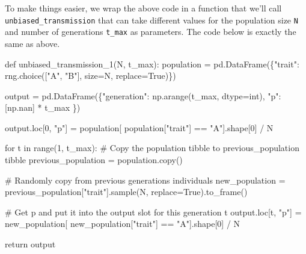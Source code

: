 \documentclass[
  a4paperpaper,
  ,captions=tableheading
]{scrbook}
\newenvironment{Shaded}{\begin{snugshade}}{\end{snugshade}}
\newcommand{\BuiltInTok}[1]{\textcolor[rgb]{0.00,0.23,0.31}{#1}}
\newcommand{\CommentTok}[1]{\textcolor[rgb]{0.37,0.37,0.37}{#1}}
\newcommand{\ControlFlowTok}[1]{\textcolor[rgb]{0.00,0.23,0.31}{#1}}
\newcommand{\DecValTok}[1]{\textcolor[rgb]{0.68,0.00,0.00}{#1}}
\newcommand{\KeywordTok}[1]{\textcolor[rgb]{0.00,0.23,0.31}{#1}}
\newcommand{\NormalTok}[1]{\textcolor[rgb]{0.00,0.23,0.31}{#1}}
\newcommand{\OperatorTok}[1]{\textcolor[rgb]{0.37,0.37,0.37}{#1}}
\newcommand{\StringTok}[1]{\textcolor[rgb]{0.13,0.47,0.30}{#1}}
\newcommand{\VariableTok}[1]{\textcolor[rgb]{0.07,0.07,0.07}{#1}}
\begin{document}
To make things easier, we wrap the above code in a function that we'll
call \texttt{unbiased\_transmission} that can take different values for
the population size \texttt{N} and number of generations \texttt{t\_max}
as parameters. The code below is exactly the same as above.

\begin{Shaded}
\begin{Highlighting}[]
\KeywordTok{def}\NormalTok{ unbiased\_transmission\_1(N, t\_max):}
\NormalTok{    population }\OperatorTok{=}\NormalTok{ pd.DataFrame(\{}\StringTok{"trait"}\NormalTok{: rng.choice([}\StringTok{"A"}\NormalTok{, }\StringTok{"B"}\NormalTok{], size}\OperatorTok{=}\NormalTok{N, replace}\OperatorTok{=}\VariableTok{True}\NormalTok{)\})}

\NormalTok{    output }\OperatorTok{=}\NormalTok{ pd.DataFrame(\{}\StringTok{"generation"}\NormalTok{: np.arange(t\_max, dtype}\OperatorTok{=}\BuiltInTok{int}\NormalTok{), }\StringTok{"p"}\NormalTok{: [np.nan] }\OperatorTok{*}\NormalTok{ t\_max \})}

\NormalTok{    output.loc[}\DecValTok{0}\NormalTok{, }\StringTok{"p"}\NormalTok{] }\OperatorTok{=}\NormalTok{ population[ population[}\StringTok{"trait"}\NormalTok{] }\OperatorTok{==} \StringTok{"A"}\NormalTok{].shape[}\DecValTok{0}\NormalTok{] }\OperatorTok{/}\NormalTok{ N}

    \ControlFlowTok{for}\NormalTok{ t }\KeywordTok{in} \BuiltInTok{range}\NormalTok{(}\DecValTok{1}\NormalTok{, t\_max):}
        \CommentTok{\# Copy the population tibble to previous\_population tibble}
\NormalTok{        previous\_population }\OperatorTok{=}\NormalTok{ population.copy()}
    
        \CommentTok{\# Randomly copy from previous generation\textquotesingle{}s individuals}
\NormalTok{        new\_population }\OperatorTok{=}\NormalTok{ previous\_population[}\StringTok{"trait"}\NormalTok{].sample(N, replace}\OperatorTok{=}\VariableTok{True}\NormalTok{).to\_frame()}
        
        \CommentTok{\# Get p and put it into the output slot for this generation t}
\NormalTok{        output.loc[t, }\StringTok{"p"}\NormalTok{] }\OperatorTok{=}\NormalTok{ new\_population[ new\_population[}\StringTok{"trait"}\NormalTok{] }\OperatorTok{==} \StringTok{"A"}\NormalTok{].shape[}\DecValTok{0}\NormalTok{] }\OperatorTok{/}\NormalTok{ N}
    
    \ControlFlowTok{return}\NormalTok{ output}
\end{Highlighting}
\end{Shaded}
\end{document}
